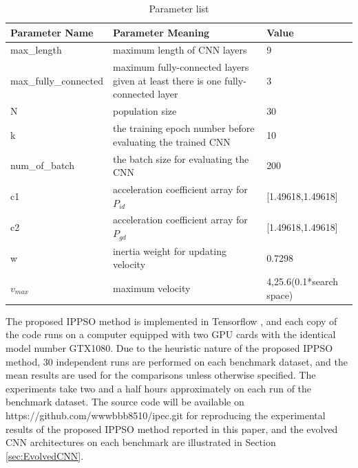 \documentclass[conference]{IEEEtran}
\begin{document}
\begin{table}[!t]
	\renewcommand{\arraystretch}{1.3}
	\caption{Parameter list}
	\label{table:ParameterList}
	\centering
	\begin{tabular}{|p{2.5cm}|p{3cm}|p{2cm}|}
		\hline
		Parameter Name & Parameter Meaning & Value\\
		\hline
		max\_length & maximum length of CNN layers & 9\\
		\hline
		max\_fully\_connected & maximum fully-connected layers given at least there is one fully-connected layer & 3\\
		\hline
		N & population size & 30\\
		\hline
		k & the training epoch number before evaluating the trained CNN & 10\\
		\hline
		num\_of\_batch & the batch size for evaluating the CNN & 200\\
		\hline
		c1 & acceleration coefficient array for $P_{id}$ & [1.49618,1.49618]\\
		\hline
		c2 & acceleration coefficient array for $P_{gd}$ & [1.49618,1.49618]\\
		\hline
		w & inertia weight for updating velocity & 0.7298\\
		\hline
		$v_{max}$ & maximum velocity & 4,25.6(0.1*search space)\\
		\hline
	\end{tabular}
\end{table}

The proposed IPPSO method is implemented in Tensorﬂow \cite{Tensorfow:Abadi}, and each copy of the code runs on a computer equipped with two GPU cards with the identical model number GTX1080. Due to the heuristic nature of the proposed IPPSO method, 30 independent runs are performed on each benchmark dataset, and the mean results are used for the comparisons unless otherwise specified. The experiments take two and a half hours approximately on each run of the benchmark dataset. The source code will be available on https://github.com/wwwbbb8510/ipec.git for reproducing the experimental results of the proposed IPPSO method reported in this paper, and the evolved CNN architectures on each benchmark are illustrated in Section \ref{sec:EvolvedCNN}.
\end{document}
